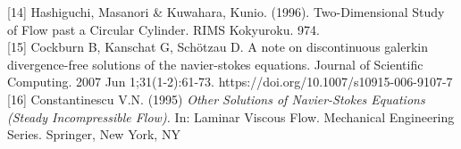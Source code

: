 \documentclass[11pt,twoside,a4paper]{article}
\begin{document}
[14] Hashiguchi, Masanori \& Kuwahara, Kunio. (1996). Two-Dimensional Study of Flow past a Circular Cylinder. RIMS Kokyuroku. 974. \\

[15] Cockburn B, Kanschat G, Schötzau D. A note on discontinuous galerkin divergence-free solutions of the navier-stokes equations. Journal of Scientific Computing. 2007 Jun 1;31(1-2):61-73. https://doi.org/10.1007/s10915-006-9107-7\\

[16] Constantinescu V.N. (1995) \textit{Other Solutions of Navier-Stokes Equations (Steady Incompressible Flow).} In: Laminar Viscous Flow. Mechanical Engineering Series. Springer, New York, NY
\end{document}
